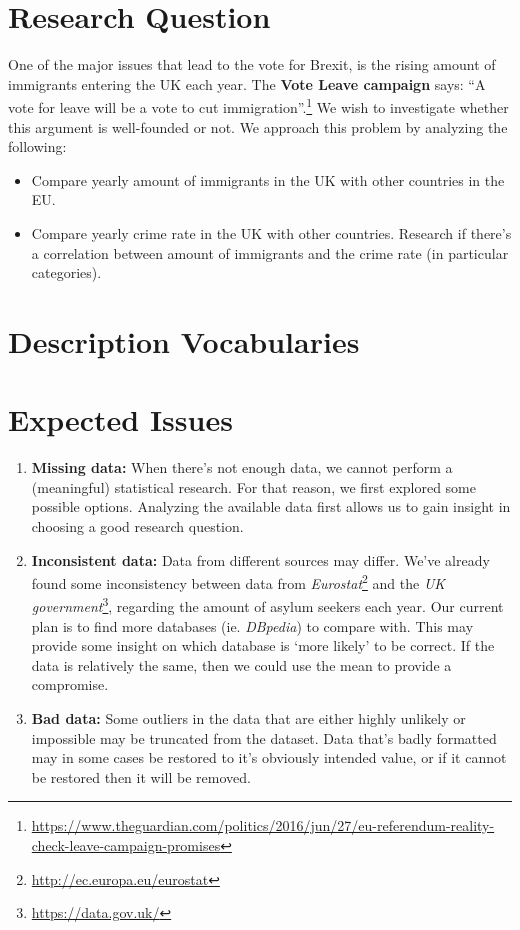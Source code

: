 \documentclass[a4paper,10pt]{article}
\begin{document}
\setlength\parindent{0pt}



\section{Research Question}

One of the major issues that lead to the vote for Brexit, is the rising amount of immigrants entering the UK each year. The \textbf{Vote Leave campaign} says: ``A vote for leave will be a vote to cut immigration''.\footnote{\url{https://www.theguardian.com/politics/2016/jun/27/eu-referendum-reality-check-leave-campaign-promises}} We wish to investigate whether this argument is well-founded or not. We approach this problem by analyzing the following:
\begin{itemize}
	\item Compare yearly amount of immigrants in the UK with other countries in the EU.
	\item Compare yearly crime rate in the UK with other countries. Research if there's a correlation between amount of immigrants and the crime rate (in particular categories).
\end{itemize}

\section{Description Vocabularies}



\section{Expected Issues}

\begin{enumerate}
	\item \textbf{Missing data:} When there's not enough data, we cannot perform a (meaningful) statistical research. For that reason, we first explored some possible options. Analyzing the available data first allows us to gain insight in choosing a good research question.
	\item \textbf{Inconsistent data:} Data from different sources may differ. We've already found some inconsistency between data from \textit{Eurostat}\footnote{\url{http://ec.europa.eu/eurostat}} and the \textit{UK government}\footnote{\url{https://data.gov.uk/}}, regarding the amount of asylum seekers each year. Our current plan is to find more databases (ie. \textit{DBpedia}) to compare with. This may provide some insight on which database is `more likely' to be correct. If the data is relatively the same, then we could use the mean to provide a compromise.
	\item \textbf{Bad data:} Some outliers in the data that are either highly unlikely or impossible may be truncated from the dataset. Data that's badly formatted may in some cases be restored to it's obviously intended value, or if it cannot be restored then it will be removed.
\end{enumerate}
\end{document}
